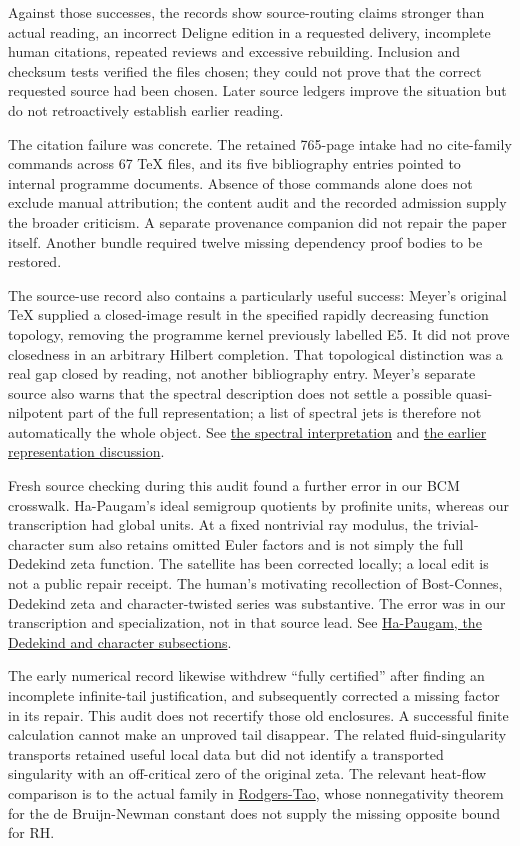\documentclass[
  british,
  11pt,
  a4paper,
]{article}
\begin{document}
Against those successes, the records show source-routing claims stronger
than actual reading, an incorrect Deligne edition in a requested
delivery, incomplete human citations, repeated reviews and excessive
rebuilding. Inclusion and checksum tests verified the files chosen; they
could not prove that the correct requested source had been chosen. Later
source ledgers improve the situation but do not retroactively establish
earlier reading.

The citation failure was concrete. The retained 765-page intake had no
cite-family commands across 67 TeX files, and its five bibliography
entries pointed to internal programme documents. Absence of those
commands alone does not exclude manual attribution; the content audit
and the recorded admission supply the broader criticism. A separate
provenance companion did not repair the paper itself. Another bundle
required twelve missing dependency proof bodies to be restored.

The source-use record also contains a particularly useful success:
Meyer's original TeX supplied a closed-image result in the specified
rapidly decreasing function topology, removing the programme kernel
previously labelled E5. It did not prove closedness in an arbitrary
Hilbert completion. That topological distinction was a real gap closed
by reading, not another bibliography entry. Meyer's separate source also
warns that the spectral description does not settle a possible
quasi-nilpotent part of the full representation; a list of spectral jets
is therefore not automatically the whole object. See
\href{https://arxiv.org/abs/math/0412277v3}{the spectral interpretation}
and \href{https://arxiv.org/abs/math/0311468v3}{the earlier
representation discussion}.

Fresh source checking during this audit found a further error in our BCM
crosswalk. Ha-Paugam's ideal semigroup quotients by profinite units,
whereas our transcription had global units. At a fixed nontrivial ray
modulus, the trivial-character sum also retains omitted Euler factors
and is not simply the full Dedekind zeta function. The satellite has
been corrected locally; a local edit is not a public repair receipt. The
human's motivating recollection of Bost-Connes, Dedekind zeta and
character-twisted series was substantive. The error was in our
transcription and specialization, not in that source lead. See
\href{https://arxiv.org/abs/math/0507101v1}{Ha-Paugam, the Dedekind and
character subsections}.

The early numerical record likewise withdrew ``fully certified'' after
finding an incomplete infinite-tail justification, and subsequently
corrected a missing factor in its repair. This audit does not recertify
those old enclosures. A successful finite calculation cannot make an
unproved tail disappear. The related fluid-singularity transports
retained useful local data but did not identify a transported
singularity with an off-critical zero of the original zeta. The relevant
heat-flow comparison is to the actual family in
\href{https://arxiv.org/abs/1801.05914v5}{Rodgers-Tao}, whose
nonnegativity theorem for the de Bruijn-Newman constant does not supply
the missing opposite bound for RH.
\end{document}
